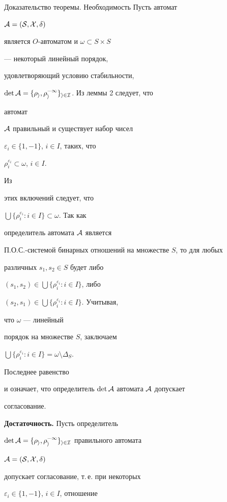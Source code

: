 \begin{pf*}{Доказательство теоремы. Необходимость} Пусть автомат


$\cal A=(S,X,\delta)$


является $O$-автоматом и $\omega\subset S\times S$


--- некоторый линейный порядок,


удовлетворяющий условию стабильности,


$\det\cal A=\{\rho_i,\rho_i^{-1}\}_{i\in I}$. Из леммы 2 следует, что


автомат


$\cal A$ правильный и существует набор чисел


$\varepsilon_i\in\{1,-1\}$, $i\in I$, таких, что


$\rho^{\varepsilon_i}_i\subset\omega$, $i\in I$.


Из


этих включений следует, что


$\bigcup\{\rho^{\varepsilon_i}_i:i\in I\}\subset\omega$. Так как


определитель автомата $\cal A$ является


П.О.С.-системой бинарных отношений на множестве $S$, то для любых


различных $s_1,s_2\in S$ будет либо


$(s_1,s_2)\in\bigcup\{\rho^{\varepsilon_i}_i:i\in I\}$, либо


$(s_2,s_1)\in\bigcup\{\rho^{\varepsilon_i}_i:i\in I\}$. Учитывая,


что $\omega$ --- линейный


порядок на множестве $S$, заключаем


$\bigcup\{\rho^{\varepsilon_i}_i:i\in I\}=\omega\setminus\Delta_S$.


Последнее равенство


и означает, что определитель $\det\cal A$ автомата $\cal A$ допускает


согласование.


\medskip





{\bf Достаточность.} Пусть определитель


$\det\cal A=\{\rho_i,\rho^{-1}_i\}_{i\in I}$ правильного автомата


$\cal A=(S,X,\delta)$


допускает согласование, т.\,е. при некоторых


$\varepsilon_i\in\{1,-1\}$, $i\in I$, отношение



\end{pf*}
